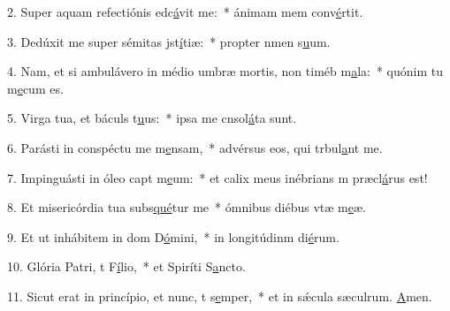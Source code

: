 2. Super aquam refectiónis edc\uline{á}vit me:~* ánimam mem conv\uline{é}rtit.\par 
3. Dedúxit me super sémitas jst\uline{í}tiæ:~* propter nmen s\uline{u}um.\par 
4. Nam, et si ambulávero in médio umbræ mortis, non timéb m\uline{a}la:~* quónim tu m\uline{e}cum es.\par 
5. Virga tua, et báculs t\uline{u}us:~* ipsa me cnsol\uline{á}ta sunt.\par 
6. Parásti in conspéctu me m\uline{e}nsam,~* advérsus eos, qui trbul\uline{a}nt me.\par 
7. Impinguásti in óleo capt m\uline{e}um:~* et calix meus inébrians m præcl\uline{á}rus est!\par 
8. Et misericórdia tua subs\uline{qué}tur me~* ómnibus diébus vtæ m\uline{e}æ.\par 
9. Et ut inhábitem in dom D\uline{ó}mini,~* in longitúdinm di\uline{é}rum.\par 
10. Glória Patri, t F\uline{í}lio,~* et Spiríti S\uline{a}ncto.\par 
11. Sicut erat in princípio, et nunc, t s\uline{e}mper,~* et in sǽcula sæculrum. \uline{A}men.\par 
